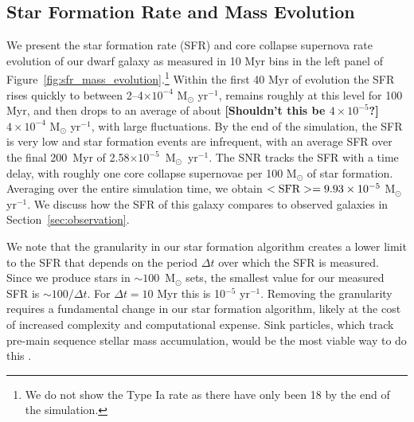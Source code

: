 \documentclass[twocolumn]{aastex61}
\begin{document}
\subsection{Star Formation Rate and Mass Evolution}
\label{sec:sfr}

We present the star formation rate (SFR) and core collapse supernova rate evolution of our dwarf galaxy as measured in 10 Myr bins in the left panel of Figure~\ref{fig:sfr_mass_evolution}.\footnote{We do not show the Type Ia rate as there have only been 18 by the end of the simulation.} Within the first 40 Myr of evolution the SFR rises quickly to between 2--4$ \times 10^{-4}$ M$_{\odot}$ yr$^{-1}$, remains roughly at this level for 100 Myr, and then drops to an average of about
  {\bf [Shouldn't this be $4 \times 10^{-5}$?]}
 $4 \times 10^{-4}$ M$_{\odot}$ yr$^{-1}$, with large fluctuations. By the end of the simulation, the SFR is very low and 
   star formation events are
infrequent, with an average SFR over the final 200~Myr of 2.58$\times 10^{-5}$~M$_{\odot}$~yr$^{-1}$. The SNR tracks the SFR with a time delay, with roughly one core collapse supernovae per 100 M$_{\odot}$ of star formation. Averaging over the entire simulation time, we obtain  $<\rm{SFR}> = 9.93 \times 10^{-5}$ M$_{\odot}$ yr$^{-1}$. We discuss how the SFR of this galaxy compares to observed galaxies in Section~\ref{sec:observation}.

We note that the granularity in our star formation algorithm creates a lower limit to the SFR that depends on the period $\Delta t$ over which the SFR is measured. Since we produce stars in $\sim 100$~M$_{\odot}$ sets, the smallest value for our measured SFR is $\sim 100/ \Delta t$. For $\Delta t = 10$ Myr this is 10$^{-5}$ yr$^{-1}$. Removing the granularity requires a fundamental change in our star formation algorithm, likely at the cost of increased complexity and computational expense. Sink particles, which track pre-main sequence stellar mass accumulation, would be the most viable way to do this \citep[see for example ][]{Krumholz2004,Federrath2010,GongOstriker2013,BleulerTeyssier2014,Sormani2017}.
\end{document}
